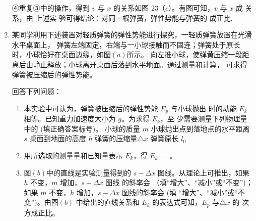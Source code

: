 \begin{enumerate}
④重复③中的操作，得到 $ v $ 与 $ x $ 的关系如图 $ 23 $（$ c $）。有图可知，$ v $ 与 $ x $ 成  关系，由 上述实
验可得结论：对同一根弹簧，弹性势能与弹簧的
成正比.





\newpage
\item 
{}
某同学利用下述装置对轻质弹簧的弹性势能进行探究，一轻质弹簧放置在光滑水平桌面上，
弹簧左端固定，右端与一小球接触而不固连；弹簧处于原长时，小球恰好在桌面边缘，如图$ (a) $所示。
向左推小球，使弹黄压缩一段距离后由静止释放；小球离开桌面后落到水平地面。通过测量和计算，
可求得弹簧被压缩后的弹性势能。
\begin{figure}[h!]
\centering

\end{figure}



回答下列问题：
\begin{enumerate}
\renewcommand{\labelenumi}{\arabic{enumi}.}
\item
本实验中可认为，弹簧被压缩后的弹性势能 $ E_{p} $ 与小球抛出
时的动能 $ E_{k} $ 相等。已知重力加速度大小为 $ g $。为求得 $ E_{k} $，至
少需要测量下列物理量中的  (填正确答案标号)。
\fivechoices
{小球的质量 $ m $}
{小球抛出点到落地点的水平距离 $ s $}
{桌面到地面的高度 $ h $}
{弹簧的压缩量$ \triangle x $}
{弹簧原长 $ l_{0} $}


\item 
用所选取的测量量和已知量表示 $ E_{k} $，得 $ E_{k} = $  。



\item 
图$ (b) $中的直线是实验测量得到的 $ s- \Delta x $ 图线。从理论上可推出，如果 $ h $ 不变，$ m $ 增加，$ s- \Delta x $ 图线
的斜率会  （填“增大”、“减小”或“不变”)；如果 $ m $ 不变，$ h $ 增加，$ s- \Delta x $ 图线的斜率会  (填
“增大”、“减小”或“不变”)。由图$ (b) $ 中给出的直线关系和 $ E_{k} $ 的表达式可知，$ E_{p} $ 与$ \triangle x $ 的  次
方成正比。
\begin{figure}[h!]
\centering

\end{figure}




\end{enumerate}







\end{enumerate}

